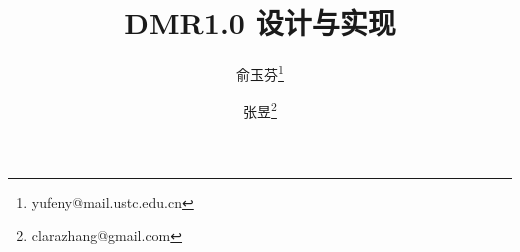 \documentclass[a4paper,11pt,titlepage]{article}
\begin{document}
\title{DMR1.0 设计与实现} 
\author{俞玉芬\thanks{yufeny@mail.ustc.edu.cn}}
\author{张昱\thanks{clarazhang@gmail.com}}


\maketitle
\tableofcontents
\setcounter{tocdepth}{3}
\newpage
{}
%
%






\begin{small}


\end{small}
\end{document}
